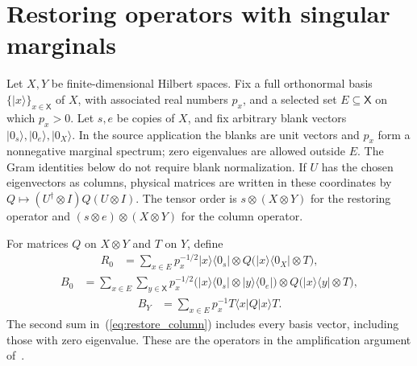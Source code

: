 \section{Restoring operators with singular marginals}
\label{sec:restoring_operators}

Let $X,Y$ be finite-dimensional Hilbert spaces. Fix a full orthonormal
basis $\{|x\rangle\}_{x\in\mathsf X}$ of $X$, with associated real
numbers $p_x$, and a selected set $E\subseteq\mathsf X$ on which $p_x>0$.
Let $s,e$ be copies of $X$, and fix arbitrary blank vectors
$|0_s\rangle,|0_e\rangle,|0_X\rangle$. In the source application the
blanks are unit vectors and $p_x$ form a nonnegative marginal spectrum;
zero eigenvalues are allowed outside $E$. The Gram identities below do
not require blank normalization.
If $U$ has the chosen eigenvectors as columns, physical matrices are
written in these coordinates by $Q\mapsto(U^\dagger\otimes I)Q(U\otimes I)$.
The tensor order is $s\otimes(X\otimes Y)$ for the restoring operator
and $(s\otimes e)\otimes(X\otimes Y)$ for the column operator.

\begin{definition}
    \label{def:restoring_operators}
    \leanok
    For matrices $Q$ on $X\otimes Y$ and $T$ on $Y$, define
    \begin{align}
        R_0&=\sum_{x\in E}p_x^{-1/2}|x\rangle\langle0_s|
            \otimes Q\bigl(|x\rangle\langle0_X|\otimes T\bigr),
            \label{eq:restore_operator}
    \end{align}
    \begin{align}
        B_0&=\sum_{x\in E}\sum_{y\in\mathsf X}p_x^{-1/2}
            \bigl(|x\rangle\langle0_s|\otimes|y\rangle\langle0_e|\bigr)
            \otimes Q\bigl(|x\rangle\langle y|\otimes T\bigr),
            \label{eq:restore_column}
    \end{align}
    \begin{align}
        B_Y&=\sum_{x\in E}p_x^{-1}T\langle x|Q|x\rangle T.
            \label{eq:restore_gram}
    \end{align}
    The second sum in~(\ref{eq:restore_column}) includes every basis
    vector, including those with zero eigenvalue. These are the operators
    in the amplification argument of~\cite{OpenAI2026AreaLaw}.
\end{definition}

